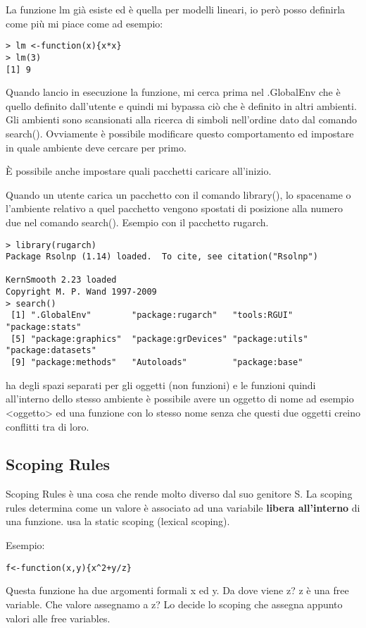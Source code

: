 La funzione lm già esiste ed è quella per modelli lineari, io però posso
definirla come più mi piace come ad esempio:
\begin{lstlisting}
> lm <-function(x){x*x}
> lm(3)
[1] 9
\end{lstlisting}
Quando lancio in esecuzione la funzione, \erre mi cerca prima nel .GlobalEnv che
è quello definito dall'utente e quindi mi bypassa ciò che è definito in altri
ambienti.
Gli ambienti sono scansionati alla ricerca di simboli nell'ordine dato dal comando
search(). Ovviamente è possibile modificare questo comportamento ed impostare
in quale ambiente \erre deve cercare per primo.

È possibile anche impostare quali pacchetti caricare all'inizio.

Quando un utente carica un pacchetto con il comando library(), lo spacename
o l'ambiente relativo a quel pacchetto vengono spostati di posizione alla numero due
nel comando search().
Esempio con il pacchetto rugarch.
\begin{lstlisting}
> library(rugarch)
Package Rsolnp (1.14) loaded.  To cite, see citation("Rsolnp")

KernSmooth 2.23 loaded
Copyright M. P. Wand 1997-2009
> search()
 [1] ".GlobalEnv"        "package:rugarch"   "tools:RGUI"        "package:stats"    
 [5] "package:graphics"  "package:grDevices" "package:utils"     "package:datasets" 
 [9] "package:methods"   "Autoloads"         "package:base"  
\end{lstlisting}
\erre ha degli spazi separati per gli oggetti (non funzioni) e
le funzioni quindi all'interno dello stesso ambiente è possibile avere
un oggetto di nome ad esempio <oggetto> ed una funzione con lo stesso nome senza che questi due oggetti creino conflitti
tra di loro.

\subsection{Scoping Rules}

Scoping Rules è una cosa che rende molto diverso \erre dal suo genitore S.
La scoping rules determina come un valore è associato ad una variabile \textbf{libera all'interno}
di una funzione.
\erre usa la static scoping (lexical scoping).

Esempio:
\begin{lstlisting}
f<-function(x,y){x^2+y/z}
\end{lstlisting}
Questa funzione ha due argomenti formali x ed y. Da dove viene z? z è una 
free variable. Che valore assegnamo a z? Lo decide lo scoping che assegna appunto valori alle free variables.


